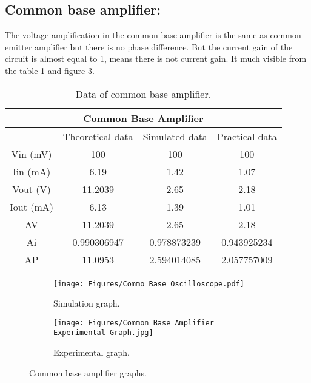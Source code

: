 \documentclass[a4paper, 12pt]{extarticle}
\begin{document}
\newpage
\restoregeometry
{}
\subsection{Common base amplifier:}
The voltage amplification in the common base amplifier is the same as common emitter amplifier but there is no phase difference. But the current gain of the circuit is almost equal to 1, means there is not current gain. It much visible from the table \ref{tab:Datas of common base amplifier} and figure \ref{fig:Common Base Amplifier Graphs.}.

\begin{table}[htbp]
  \centering
  \caption{Data of common base amplifier.}
    \begin{tabular}{|c|c|c|c|}
    \toprule
    \multicolumn{4}{|c|}{Common Base Amplifier} \\
    \midrule
          & Theoretical data & Simulated data & Practical data \\
    \midrule
    Vin (mV) & 100   & 100   & 100 \\
    \midrule
    Iin (mA) & 6.19  & 1.42  & 1.07 \\
    \midrule
    Vout (V) & 11.2039 & 2.65  & 2.18 \\
    \midrule
    Iout (mA) & 6.13  & 1.39  & 1.01 \\
    \midrule
    AV    & 11.2039 & 2.65  & 2.18 \\
    \midrule
    Ai    & 0.990306947 & 0.978873239 & 0.943925234 \\
    \midrule
    AP    & 11.0953 & 2.594014085 & 2.057757009 \\
    \bottomrule
    \end{tabular}%
  \label{tab:Datas of common base amplifier}%
\end{table}%

\begin{figure}[htbp]
    \centering
        \begin{subfigure}[h]{0.48\textwidth}
        \centering
            \texttt{[image: Figures/Commo Base Oscilloscope.pdf]}
            \caption{Simulation graph.}
            \label{fig:Common Base Amplifier Simulation Graph}
        \end{subfigure}
        \hfill
        \begin{subfigure}[h]{0.48\textwidth}
        \centering
            \texttt{[image: Figures/Common Base Amplifier Experimental Graph.jpg]}
            \caption{Experimental graph.}
            \label{fig:Common Base Amplifier Experimental Graph}
        \end{subfigure}
        \caption{Common base amplifier graphs.}
        \label{fig:Common Base Amplifier Graphs.}
\end{figure}
\end{document}

